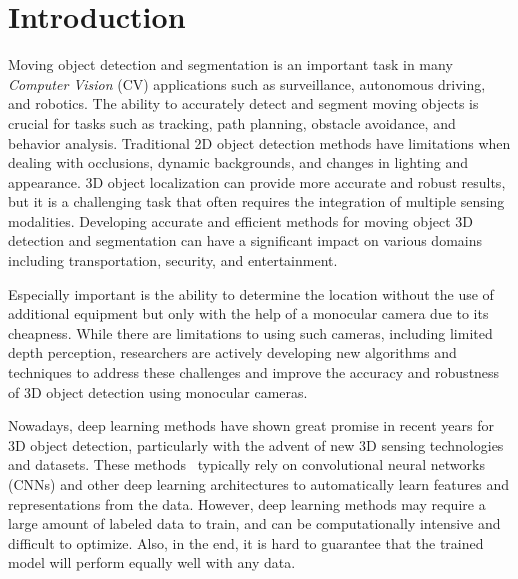 \documentclass[graybox]{svmult}
\begin{document}
%
\section{Introduction}
\label{sec:1}
Moving object detection and segmentation is an important task in many  \emph{Computer Vision} (CV)  applications such as surveillance, autonomous driving, and robotics. The ability to accurately detect and segment moving objects is crucial for tasks such as tracking, path planning, obstacle avoidance, and behavior analysis. Traditional 2D object detection methods have limitations when dealing with occlusions, dynamic backgrounds, and changes in lighting and appearance. 3D object localization can provide more accurate and robust results, but it is a challenging task that often requires the integration of multiple sensing modalities. Developing accurate and efficient  methods for moving object 3D detection and segmentation can have a significant impact on various domains including transportation, security, and entertainment.


Especially important is the ability to determine the location without the use of additional equipment  \cite{lidar,3d_cam}
but only with the help of a monocular camera due to its cheapness.
While there are limitations to using such cameras, including limited depth perception, researchers are actively developing new algorithms and techniques to address these challenges and improve the accuracy and robustness of 3D object detection using monocular cameras.


Nowadays, deep learning methods have shown great promise in recent years for 3D object detection, particularly with the advent of new 3D sensing technologies and datasets.
These methods~\cite{yolo_paper,traffic} typically rely on convolutional neural networks (CNNs) and other deep learning architectures to automatically learn features and representations from the data. However, deep learning methods may require a large amount of labeled data to train, and can be computationally intensive and difficult to optimize.
Also, in the end, it is hard to guarantee that the trained model will perform equally well with any data.
\end{document}
